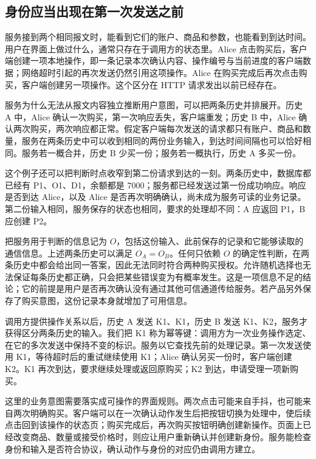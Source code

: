 \subsection*{身份应当出现在第一次发送之前}

服务接到两个相同报文时，能看到它们的账户、商品和参数，也能看到到达时间。用户在界面上做过什么，通常只存在于调用方的状态里。Alice 点击购买后，客户端创建一项本地操作，即一条记录本次确认内容、操作编号与当前进度的客户端数据；网络超时引起的再次发送仍然引用这项操作。Alice 在购买完成后再次点击购买，客户端创建另一项操作。这个区分在 HTTP 请求发出以前已经存在。

服务为什么无法从报文内容独立推断用户意图，可以把两条历史并排展开。历史 A 中，Alice 确认一次购买，第一次响应丢失，客户端重发；历史 B 中，Alice 确认两次购买，两次响应都正常。假定客户端每次发送的请求都只有账户、商品和数量，服务在两条历史中可以收到相同的两份业务输入，到达时间间隔也可以恰好相同。服务若一概合并，历史 B 少买一份；服务若一概执行，历史 A 多买一份。



这个例子还可以把判断时点收窄到第二份请求到达的一刻。两条历史中，数据库都已经有 P1、O1、D1，余额都是 7000；服务都已经发送过第一份成功响应。响应是否到达 Alice，以及 Alice 是否再次明确确认，尚未成为服务可读的业务记录。第二份输入相同，服务保存的状态也相同，要求的处理却不同：A 应返回 P1，B 应创建 P2。

把服务用于判断的信息记为 \(O\)，包括这份输入、此前保存的记录和它能够读取的通信信息。上述两条历史可以满足 \(O_A=O_B\)。任何只依赖 \(O\) 的确定性判断，在两条历史中都会给出同一答案，因此无法同时符合两种购买授权。允许随机选择也无法保证每条历史都正确，只会把某些错误变为有概率发生。这是一项信息不足的结论；它的前提是用户是否再次确认没有通过其他可信通道传给服务。若产品另外保存了购买意图，这份记录本身就增加了可用信息。

调用方提供操作关系以后，历史 A 发送 K1、K1，历史 B 发送 K1、K2，服务才获得区分两条历史的输入。我们把 K1 称为幂等键：调用方为一次业务操作选定、在它的多次发送中保持不变的标识。服务以它查找先前的处理记录。第一次发送使用 K1，等待超时后的重试继续使用 K1；Alice 确认另买一份时，客户端创建 K2。K1 再次到达，要求继续处理或返回原购买；K2 到达，申请受理一项新购买。



这里的业务意图需要落实成可操作的界面规则。两次点击可能来自手抖，也可能来自两次明确购买。客户端可以在一次确认动作发生后把按钮切换为处理中，使后续点击回到该操作的状态页；购买完成后，再次购买按钮明确创建新操作。页面上已经改变商品、数量或接受价格时，则应让用户重新确认并创建新身份。服务能检查身份和输入是否符合协议，确认动作与身份的对应仍由调用方建立。


